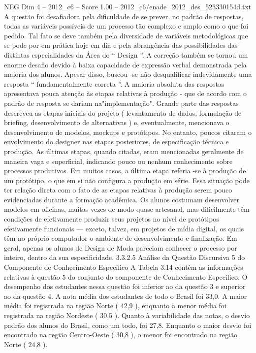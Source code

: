 \begin{textsample}{NEG Dim 4 – 2012\_c6 – Score 1.00 – 2012\_c6/enade\_2012\_des\_523330154d.txt}
A questão foi desafiadora pela dificuldade de se prever, no padrão de respostas, todas as variáveis possíveis de um processo tão complexo e amplo como o que foi pedido.
Tal fato se deve também pela diversidade de variáveis metodológicas que se pode por em prática hoje em dia e pela abrangência das possibilidades das distintas especialidades da Área do “ Design ”.
A correção também se tornou um enorme desafio devido à baixa capacidade de expressão verbal demonstrada pela maioria dos alunos.
Apesar disso, buscou -se não desqualificar indevidamente uma resposta “ fundamentalmente correta ”.
A maioria absoluta das respostas apresentava pouca atenção às etapas relativas à produção - que de acordo com o padrão de resposta se dariam na"implementação".
Grande parte das respostas descreveu as etapas iniciais do projeto ( levantamento de dados, formulação de briefing, desenvolvimento de alternativas ) e, eventualmente, mencionava o desenvolvimento de modelos, mockups e protótipos.
No entanto, poucos citaram o envolvimento do designer nas etapas posteriores, de especificação técnica e produção.
As últimas etapas, quando citadas, eram mencionadas geralmente de maneira vaga e superficial, indicando pouco ou nenhum conhecimento sobre processos produtivos.
Em muitos casos, a última etapa referia -se à produção de um protótipo, o que em si não configura a produção em série.
Essa situação pode ter relação direta com o fato de as etapas relativas à produção serem pouco evidenciadas durante a formação acadêmica.
Os alunos costumam desenvolver modelos em oficinas, muitas vezes de modo quase artesanal, mas dificilmente têm condições de efetivamente produzir seus projetos no nível de protótipos efetivamente funcionais — exceto, talvez, em projetos de mídia digital, os quais têm no próprio computador o ambiente de desenvolvimento e finalização.
Em geral, apenas os alunos de Design de Moda pareciam conhecer o processo por inteiro, dentro da sua especificidade. 3.3.2.5 Análise da Questão Discursiva 5 do Componente de Conhecimento Específico A Tabela 3.14 contém as informações relativas à questão 5 do conjunto do componente de Conhecimento Específico.
O desempenho dos estudantes nessa questão foi inferior ao da questão 3 e superior ao da questão 4.
A nota média dos estudantes de todo o Brasil foi 33,0.
A maior média foi registrada na região Norte ( 42,9 ), enquanto a menor média foi registrada na região Nordeste ( 30,5 ).
Quanto à variabilidade das notas, o desvio padrão dos alunos do Brasil, como um todo, foi 27,8.
Enquanto o maior desvio foi encontrado na região Centro-Oeste ( 30,8 ), o menor foi encontrado na região Norte ( 24,8 ).

\end{textsample}
